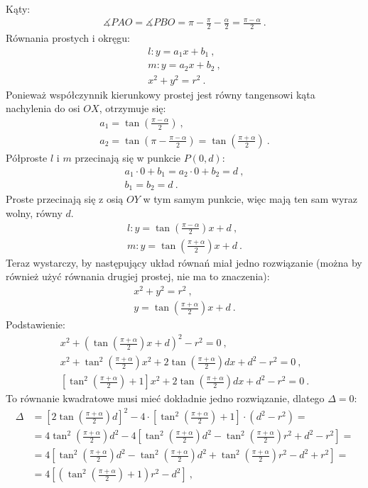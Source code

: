 \noindent Kąty:
\begin{gather*}
\measuredangle PAO = \measuredangle PBO = \pi - \frac{\pi}{2} - \frac{\alpha}{2} = \frac{\pi - \alpha}{2}\ . 
\end{gather*}
Równania prostych i okręgu:
\begin{gather*}
l: y = a_1x + b_1\ ,\\
m: y = a_2x + b_2\ ,\\
x^2 + y^2 = r^2\ .
\end{gather*}
Ponieważ współczynnik kierunkowy prostej jest równy tangensowi kąta nachylenia do osi $OX$, otrzymuje się:
\begin{gather*}
a_1 = \tan (\frac{\pi - \alpha}{2})\ , \\ 
a_2 = \tan (\pi - \frac{\pi - \alpha}{2}) = \tan (\frac{\pi + \alpha}{2})\ .
\end{gather*}
Półproste $l$ i $m$ przecinają się w punkcie $P(0, d)$:
\begin{gather*}
a_1 \cdot 0 + b_1 = a_2 \cdot 0 + b_2 = d\ , \\
b_1 = b_2 = d\ .
\end{gather*}
Proste przecinają się z osią $OY$ w tym samym punkcie, więc mają ten sam wyraz wolny, równy $d$.
\begin{gather*}
l: y = \tan (\frac{\pi - \alpha}{2})x + d\ , \\
m: y = \tan (\frac{\pi + \alpha}{2})x + d\ .
\end{gather*}
Teraz wystarczy, by następujący układ równań miał jedno rozwiązanie (można by również użyć równania drugiej prostej, nie ma to znaczenia):
\begin{gather*}
x^2 + y^2 = r^2\ , \\ 
y = \tan (\frac{\pi + \alpha}{2})x + d\ .
\end{gather*}
Podstawienie:
\begin{gather*}
x^2 + (\tan(\frac{\pi + \alpha}{2})x + d)^2 - r^2 = 0\ , \\
x^2 + \tan^2(\frac{\pi + \alpha}{2})x^2 + 2\tan(\frac{\pi + \alpha}{2})dx + d^2 - r^2 = 0\ , \\
[\tan^2(\frac{\pi + \alpha}{2}) + 1]x^2 + 2\tan(\frac{\pi + \alpha}{2})dx + d^2 - r^2 = 0\ .
\end{gather*}
To równanie kwadratowe musi mieć dokładnie jedno rozwiązanie, dlatego $\Delta = 0$:
\begin{equation*}
\begin{split}
\Delta & = [2\tan(\frac{\pi + \alpha}{2})d]^2 - 4\cdot[\tan^2(\frac{\pi + \alpha}{2}) + 1]\cdot (d^2 - r^2) = \\
 & = 4\tan^2(\frac{\pi + \alpha}{2})d^2 - 4[\tan^2(\frac{\pi + \alpha}{2})d^2 - \tan^2(\frac{\pi + \alpha}{2})r^2 + d^2 - r^2] = \\
 & = 4[\tan^2(\frac{\pi + \alpha}{2})d^2 - \tan^2(\frac{\pi + \alpha}{2})d^2 + \tan^2(\frac{\pi + \alpha}{2})r^2 - d^2 + r^2] = \\
 & = 4[(\tan^2(\frac{\pi + \alpha}{2}) + 1)r^2 - d^2]\ ,
\end{split}
\end{equation*}
